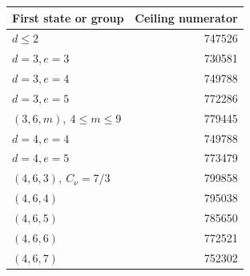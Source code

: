 \begin{center}
\small
\begin{tabular}{lr}
First state or group&Ceiling numerator\\ \hline
\(d\le2\)&747526\\
\(d=3,e=3\)&730581\\
\(d=3,e=4\)&749788\\
\(d=3,e=5\)&772286\\
\((3,6,m),\ 4\le m\le9\)&779445\\
\(d=4,e=4\)&749788\\
\(d=4,e=5\)&773479\\
\((4,6,3),\ C_\nu=7/3\)&799858\\
\((4,6,4)\)&795038\\
\((4,6,5)\)&785650\\
\((4,6,6)\)&772521\\
\((4,6,7)\)&752302\\
\end{tabular}
\end{center}
